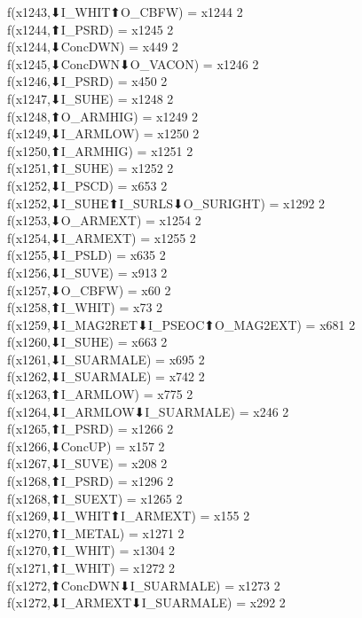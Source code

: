 f(x1243,⬇I_WHIT⬆O_CBFW) = x1244 {2} \\
f(x1244,⬆I_PSRD) = x1245 {2} \\
f(x1244,⬇ConcDWN) = x449 {2} \\
f(x1245,⬇ConcDWN⬇O_VACON) = x1246 {2} \\
f(x1246,⬇I_PSRD) = x450 {2} \\
f(x1247,⬇I_SUHE) = x1248 {2} \\
f(x1248,⬆O_ARMHIG) = x1249 {2} \\
f(x1249,⬇I_ARMLOW) = x1250 {2} \\
f(x1250,⬆I_ARMHIG) = x1251 {2} \\
f(x1251,⬆I_SUHE) = x1252 {2} \\
f(x1252,⬇I_PSCD) = x653 {2} \\
f(x1252,⬇I_SUHE⬆I_SURLS⬇O_SURIGHT) = x1292 {2} \\
f(x1253,⬇O_ARMEXT) = x1254 {2} \\
f(x1254,⬇I_ARMEXT) = x1255 {2} \\
f(x1255,⬇I_PSLD) = x635 {2} \\
f(x1256,⬇I_SUVE) = x913 {2} \\
f(x1257,⬇O_CBFW) = x60 {2} \\
f(x1258,⬆I_WHIT) = x73 {2} \\
f(x1259,⬇I_MAG2RET⬇I_PSEOC⬆O_MAG2EXT) = x681 {2} \\
f(x1260,⬇I_SUHE) = x663 {2} \\
f(x1261,⬇I_SUARMALE) = x695 {2} \\
f(x1262,⬇I_SUARMALE) = x742 {2} \\
f(x1263,⬆I_ARMLOW) = x775 {2} \\
f(x1264,⬇I_ARMLOW⬇I_SUARMALE) = x246 {2} \\
f(x1265,⬆I_PSRD) = x1266 {2} \\
f(x1266,⬇ConcUP) = x157 {2} \\
f(x1267,⬇I_SUVE) = x208 {2} \\
f(x1268,⬆I_PSRD) = x1296 {2} \\
f(x1268,⬆I_SUEXT) = x1265 {2} \\
f(x1269,⬇I_WHIT⬆I_ARMEXT) = x155 {2} \\
f(x1270,⬆I_METAL) = x1271 {2} \\
f(x1270,⬆I_WHIT) = x1304 {2} \\
f(x1271,⬆I_WHIT) = x1272 {2} \\
f(x1272,⬆ConcDWN⬇I_SUARMALE) = x1273 {2} \\
f(x1272,⬇I_ARMEXT⬇I_SUARMALE) = x292 {2} \\

